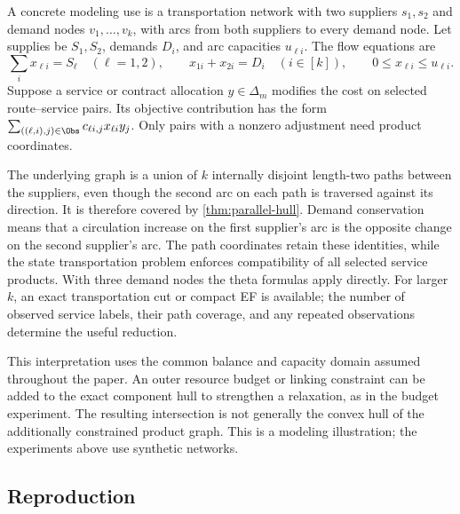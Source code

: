 A concrete modeling use is a transportation network with two suppliers
$s_1,s_2$ and demand nodes $v_1,\ldots,v_k$, with arcs from both suppliers
to every demand node. Let supplies be $S_1,S_2$, demands $D_i$, and
arc capacities $u_{\ell i}$. The flow equations are
\[
 \sum_i x_{\ell i}=S_\ell\quad(\ell=1,2),\qquad
 x_{1i}+x_{2i}=D_i\quad(i\in[k]),\qquad
 0\le x_{\ell i}\le u_{\ell i}.
\]
Suppose a service or contract allocation $y\in\Delta_m$ modifies the
cost on selected route--service pairs. Its objective contribution has the
form $\sum_{((\ell,i),j)\in\Obs}c_{\ell i,j}x_{\ell i}y_j$.
Only pairs with a nonzero adjustment need product coordinates.

The underlying graph is a union of $k$ internally disjoint length-two
paths between the suppliers, even though the second arc on each path is
traversed against its direction. It is therefore covered by
\cref{thm:parallel-hull}. Demand conservation means that a circulation
increase on the first supplier's arc is the opposite change on the second
supplier's arc. The path coordinates retain these identities, while the
state transportation problem enforces compatibility of all selected service
products. With three demand nodes the theta formulas apply directly.
For larger $k$, an exact transportation cut or compact EF is available;
the number of observed service labels, their path coverage, and any repeated
observations determine the useful reduction.

This interpretation uses the common balance and capacity domain assumed
throughout the paper. An outer resource budget or linking constraint can be
added to the exact component hull to strengthen a relaxation, as in the
budget experiment. The resulting intersection is not generally the convex
hull of the additionally constrained product graph. This is a modeling
illustration; the experiments above use synthetic networks.

\subsection{Reproduction}

